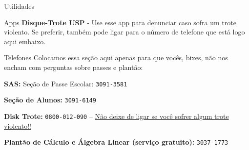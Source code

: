 \begin{secao}{Utilidades}
\begin{subsecao}{Apps}
{\bf Disque-Trote USP} - Use esse app para denunciar caso sofra um trote violento. Se
preferir, também pode ligar para o número de telefone que está logo aqui embaixo.

\end{subsecao}

\begin{subsecao}{Telefones}
Colocamos essa seção aqui apenas para que vocês, bixes, não nos encham com perguntas
sobre passes e plantão:

{\bf SAS:} Seção de Passe Escolar: {\tt 3091-3581}

{\bf Seção de Alunos:} {\tt 3091-6149}

{\bf Disk Trote:} {\tt 0800-012-090} -- \underline{Não deixe de ligar se você sofrer algum trote violento!!}

{\bf Plantão de Cálculo e Álgebra Linear (serviço gratuito):} {\tt 3037-1773}

\end{subsecao}
\end{secao}
